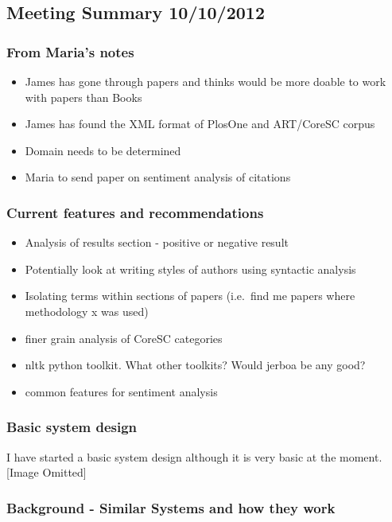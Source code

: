 \subsection{Meeting Summary 10/10/2012}

\subsubsection{From Maria's notes}

\begin{itemize}
\item
  James has gone through papers and thinks would be more doable to work
  with papers than Books
\item
  James has found the XML format of PlosOne and ART/CoreSC corpus
\item
  Domain needs to be determined
\item
  Maria to send paper on sentiment analysis of citations
\end{itemize}

\subsubsection{Current features and recommendations}

\begin{itemize}
\item
  Analysis of results section - positive or negative result
\item
  Potentially look at writing styles of authors using syntactic analysis
\item
  Isolating terms within sections of papers (i.e.~find me papers where
  methodology x was used)
\item
  finer grain analysis of CoreSC categories
\item
  nltk python toolkit. What other toolkits? Would jerboa be any good?
\item
  common features for sentiment analysis
\end{itemize}

\subsubsection{Basic system design}

I have started a basic system design although it is very basic at the
moment. [Image Omitted]

\subsubsection{Background - Similar Systems and how they work}

